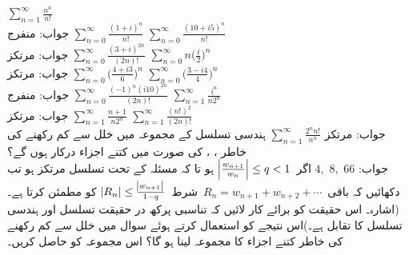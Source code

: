 \quad
$\sum\limits_{n=1}^{\infty} \tfrac{n^n}{n!}$\\
جواب:\quad
منفرج
\quad
$\sum\limits_{n=0}^{\infty}\tfrac{(1+i)^n}{n!}$
\quad
$\sum\limits_{n=0}^{\infty}\tfrac{(10+i5)^n}{n!}$\\
جواب:\quad
مرتکز
\quad
$\sum\limits_{n=0}^{\infty}\tfrac{(3+i)^{2n}}{(2n)!}$
\quad
$\sum\limits_{n=0}^{\infty}n\big(\tfrac{i}{2}\big)^n$\\
جواب:\quad
مرتکز
\quad
$\sum\limits_{n=0}^{\infty}\big(\tfrac{4+i3}{6}\big)^n$
\quad
$\sum\limits_{n=0}^{\infty}\big(\tfrac{3-i4}{4}\big)^n$\\
جواب:\quad
منفرج
\quad
$\sum\limits_{n=0}^{\infty}\tfrac{(-1)^n(i10)^{2n}}{(2n)!}$
\quad
$\sum\limits_{n=1}^{\infty}\tfrac{i^n}{n2^n}$\\
جواب:\quad
مرتکز
\quad
$\sum\limits_{n=1}^{\infty}\tfrac{n+1}{n2^n}$
\quad
$\sum\limits_{n=1}^{\infty}\tfrac{(n!)^2}{(2n)!}$\\
جواب:\quad
مرتکز
\quad
$\sum\limits_{n=1}^{\infty}\tfrac{2^n n!}{n^n}$
\quad
ہندسی تسلسل  کے مجموعہ   میں خلل  سے کم رکھنے کی خاطر ، ،  کی صورت میں کتنے اجزاء درکار ہوں گے؟\\
جواب:\quad
$4,\,\, 8,\,\, 66$
\quad
اگر 
$\,\abs{\tfrac{w_{n+1}}{w_n}}\le q<1\,$
ہو تا کہ مسئلہ  کے تحت تسلسل  مرتکز ہو تب دکھائیں کہ باقی
$\,R_n=w_{n+1}+w_{n+2}+\cdots\,$
شرط
$\,\abs{R_n}\le \tfrac{\abs{w_{n+1}}}{1-q}\,$
کو مطمئن کرتا ہے۔(اشارہ۔ اس حقیقت کو برائے کار لائیں کہ تناسبی پرکھ در حقیقت تسلسل  اور ہندسی تسلسل کا تقابل ہے۔)اس نتیجے کو استعمال کرتے  ہوئے  سوال  میں خلل  سے کم رکھنے کی خاطر کتنے اجزاء کا مجموعہ  لینا ہو گا؟  اس مجموعہ  کو حاصل کریں۔

